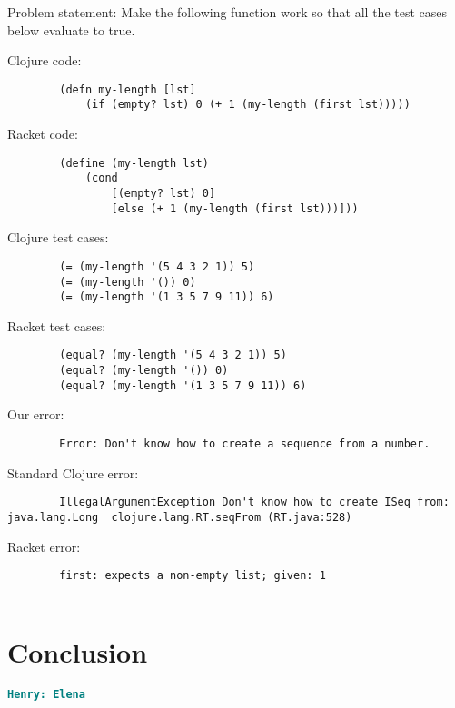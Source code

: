 \documentclass[12pt]{article}
\newcommand{\comment}[1]{{\bf \tt  {#1}}}
\newcommand{\hfcomment}[1]{\textcolor{Teal}{\comment{Henry: {#1}}}}
\begin{document}
	
	

	Problem statement:
		Make the following function work so that all the test cases below evaluate to true. 
		
		
	Clojure code:
\begin{verbatim}
		(defn my-length [lst]
 			(if (empty? lst) 0 (+ 1 (my-length (first lst)))))
\end{verbatim}
	Racket code:
\begin{verbatim}
		(define (my-length lst)
  			(cond
 				[(empty? lst) 0]
   				[else (+ 1 (my-length (first lst)))]))
\end{verbatim}
	Clojure test cases:
\begin{verbatim}
		(= (my-length '(5 4 3 2 1)) 5)
		(= (my-length '()) 0)
		(= (my-length '(1 3 5 7 9 11)) 6)
\end{verbatim}
	Racket test cases:
\begin{verbatim}
		(equal? (my-length '(5 4 3 2 1)) 5)
		(equal? (my-length '()) 0)
		(equal? (my-length '(1 3 5 7 9 11)) 6)
\end{verbatim}
	Our error:
\begin{verbatim}
		Error: Don't know how to create a sequence from a number.
\end{verbatim}
	Standard Clojure error:
\begin{verbatim}
		IllegalArgumentException Don't know how to create ISeq from: java.lang.Long  clojure.lang.RT.seqFrom (RT.java:528)

\end{verbatim}
	Racket error:
\begin{verbatim}
		first: expects a non-empty list; given: 1
		
\end{verbatim}


\section{Conclusion}\label{sec:conclusion}
	\hfcomment{Elena}




\end{document}
